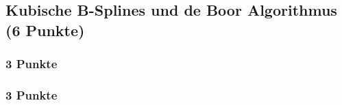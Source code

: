 \newif\ifvimbug
\vimbugfalse

\ifvimbug

\fi


\subsection{Kubische B-Splines und de Boor Algorithmus (6 Punkte)}
\subsubsection{3 Punkte}
\subsubsection{3 Punkte}
